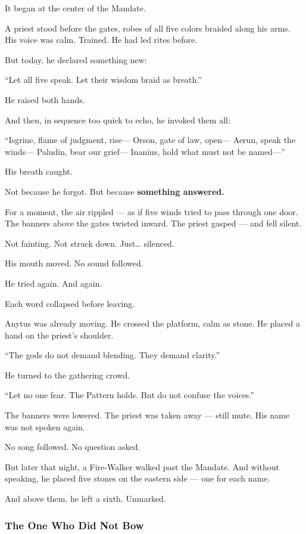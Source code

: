 \documentclass[12pt]{article}
\begin{document}
It began at the center of the Mandate.

A priest stood before the gates,  
robes of all five colors braided along his arms.  
His voice was calm. Trained.  
He had led rites before.

But today, he declared something new:

 “Let all five speak.  
 Let their wisdom braid as breath.”

He raised both hands.

And then, in sequence too quick to echo,  
he invoked them all:

 “Isgrine, flame of judgment, rise—  
Orson, gate of law, open—  
Aerun, speak the winds—  
Paludin, bear our grief—  
Inanius, hold what must not be named—”

His breath caught.

Not because he forgot.  
But because \textbf{something answered.}

For a moment, the air rippled — as if five winds tried to pass through one door.  
The banners above the gates twisted inward.  
The priest gasped — and fell silent.

Not fainting.  
Not struck down.  
Just… silenced.

His mouth moved.  
No sound followed.

He tried again.  
And again.

Each word collapsed before leaving.

Anytus was already moving.  
He crossed the platform, calm as stone.  
He placed a hand on the priest’s shoulder.

 “The gods do not demand blending.  
 They demand clarity.”

He turned to the gathering crowd.

 “Let no one fear.  
 The Pattern holds.  
 But do not confuse the voices.”

The banners were lowered.  
The priest was taken away — still mute.  
His name was not spoken again.

No song followed.  
No question asked.

But later that night, a Fire-Walker walked past the Mandate.  
And without speaking, he placed five stones on the eastern side —  
one for each name.

And above them, he left a sixth.  
Unmarked.

\dotfill

\subsubsection*{The One Who Did Not Bow}
\end{document}
